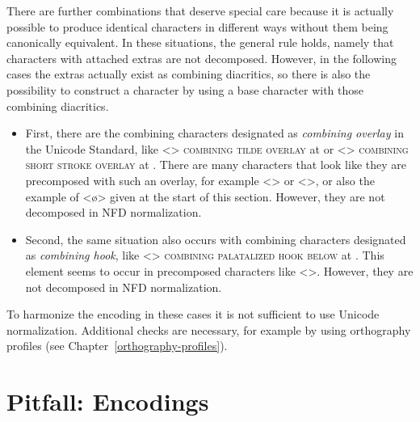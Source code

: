 There are further combinations that deserve special care because it is actually
possible to produce identical characters in different ways without them being
canonically equivalent. In these situations, the general rule holds, namely that
characters with attached extras are not decomposed. However, in the following
cases the extras actually exist as combining diacritics, so there is also 
the possibility to construct a character by using a base character with those 
combining diacritics.

\begin{itemize}
  
  \item First, there are the combining characters designated as \textit{combining
        overlay} in the Unicode Standard, like <>
        \textsc{combining tilde overlay} at  or <>
        \textsc{combining short stroke overlay} at . There are many
        characters that look like they are precomposed with such an overlay,
        for example <> or <>, or also the
        example of <ø> given at the start of this section. However, they are 
        not decomposed in NFD normalization.
  \item Second, the same situation also occurs with combining characters
        designated as \textit{combining hook}, like 
        <{}> \textsc{combining
        palatalized hook below} at . This element seems to occur in
        precomposed characters like <>. However, they are 
        not decomposed in NFD normalization.
        
\end{itemize}

To harmonize the encoding in these cases it is not sufficient to use Unicode 
normalization. Additional checks are necessary, for example by using orthography 
profiles (see Chapter~\ref{orthography-profiles}).


\section{Pitfall: Encodings}
\label{encodings}


